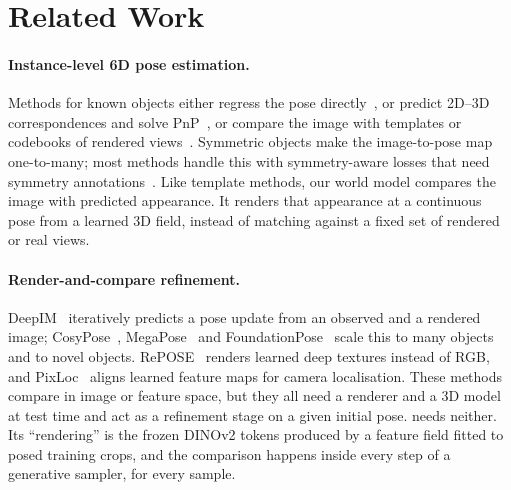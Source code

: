 \section{Related Work}
\label{sec:related}

\paragraph{Instance-level 6D pose estimation.}
Methods for known objects either regress the pose directly~\cite{xiang2018posecnn,wang2021gdrnet,liu2025gdrnpp}, or predict 2D--3D
correspondences and solve PnP~\cite{li2019cdpn,hodan2020epos,haugaard2022surfemb,su2022zebrapose,chen2022epropnp}, or compare the image
with templates or codebooks of rendered views~\cite{sundermeyer2018aae,nguyen2022templates,nguyen2024gigapose}. Symmetric objects make
the image-to-pose map one-to-many; most methods handle this with symmetry-aware losses that need symmetry
annotations~\cite{wang2021gdrnet,liu2025gdrnpp}. Like template methods, our world model compares the image with predicted
appearance. It renders that appearance at a continuous pose from a learned 3D field, instead of matching against a fixed set of
rendered or real views.

\paragraph{Render-and-compare refinement.}
DeepIM~\cite{li2018deepim} iteratively predicts a pose update from an observed and a rendered image; CosyPose~\cite{labbe2020cosypose},
MegaPose~\cite{labbe2022megapose} and FoundationPose~\cite{wen2024foundationpose} scale this to many objects and to novel objects.
RePOSE~\cite{iwase2021repose} renders learned deep textures instead of RGB, and PixLoc~\cite{sarlin2021pixloc} aligns learned
feature maps for camera localisation. These methods compare in image or feature space, but they all need a renderer and a 3D model at
test time and act as a refinement stage on a given initial pose. \method needs neither. Its ``rendering'' is the frozen DINOv2
tokens produced by a feature field fitted to posed training crops, and the comparison happens inside every step of a generative sampler,
for every sample.


